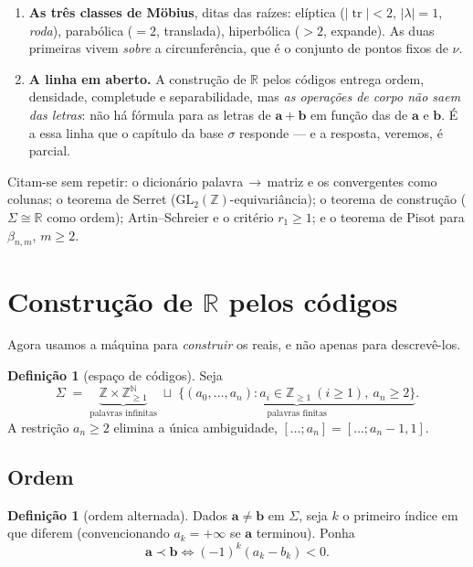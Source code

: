 \documentclass[11pt,a4paper]{article}
\theoremstyle{plain}
\theoremstyle{definition}
\newtheorem{definicao}[teorema]{Definição}
\theoremstyle{remark}
\newcommand{\R}{\mathbb{R}}
\newcommand{\Z}{\mathbb{Z}}
\newcommand{\N}{\mathbb{N}}
\newcommand{\GL}{\mathrm{GL}}
\newcommand{\Sig}{\Sigma}
\newcommand{\cf}[2]{[#1;#2]}
\begin{document}
\begin{enumerate}
\item[\textbf{(I7)}] \textbf{As três classes de Möbius}, ditas das raízes:
elíptica ($|\operatorname{tr}|<2$, $|\lambda|=1$, \emph{roda}), parabólica ($=2$, translada),
hiperbólica ($>2$, expande). As duas primeiras vivem \emph{sobre} a circunferência, que é o
conjunto de pontos fixos de $\nu$. \label{I7}

\item[\textbf{(I8)}] \textbf{A linha em aberto.} A construção de $\R$ pelos códigos entrega ordem,
densidade, completude e separabilidade, mas \emph{as operações de corpo não saem das letras}: não
há fórmula para as letras de $\mathbf a+\mathbf b$ em função das de $\mathbf a$ e $\mathbf b$. É a
essa linha que o capítulo da base $\sigma$ responde --- e a resposta, veremos, é parcial.
\label{I8}
\end{enumerate}

\noindent Citam-se sem repetir: o dicionário palavra\,$\to$\,matriz e os convergentes como colunas;
o teorema de Serret ($\GL_2(\Z)$-equivariância); o teorema de construção ($\Sigma\cong\R$ como
ordem); Artin--Schreier e o critério $r_1\geq1$; e o teorema de Pisot para $\beta_{n,m}$, $m\geq2$.


\section{Construção de \texorpdfstring{$\R$}{R} pelos códigos}\label{sec:constr}

Agora usamos a máquina para \emph{construir} os reais, e não apenas para descrevê-los.

\begin{definicao}[espaço de códigos]
Seja
\[
  \Sig \;=\; \underbrace{\Z\times\Z_{\geq1}^{\N}}_{\text{palavras infinitas}}
  \;\sqcup\;
  \underbrace{\{(a_0,\dots,a_n): a_i\in\Z_{\geq1}\ (i\geq1),\ a_n\geq 2\}}_{\text{palavras finitas}} .
\]
A restrição $a_n \geq 2$ elimina a única ambiguidade, $\cf{\dots}{a_n}=\cf{\dots}{a_n-1,1}$.
\end{definicao}

\subsection{Ordem}\label{sec:ord}

\begin{definicao}[ordem alternada]\label{prop:ordem}
Dados $\mathbf a \neq \mathbf b$ em $\Sig$, seja $k$ o primeiro índice em que diferem
(convencionando $a_k = +\infty$ se $\mathbf a$ terminou). Ponha
\[
  \mathbf a \prec \mathbf b \iff (-1)^k (a_k - b_k) < 0 .
\]
\end{definicao}
\end{document}
